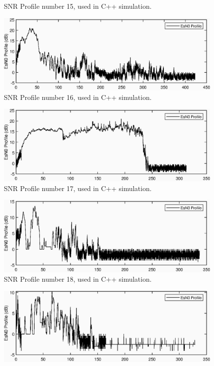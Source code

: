 \begin{appendices}
\begin{figure}[ht!]
\caption{SNR Profile number 15, used in C++ simulation.}
\end{figure}
\begin{figure}[ht!]
\includegraphics{figures/c_sim_snr/EsNo_profile_16.eps}
\caption{SNR Profile number 16, used in C++ simulation.}
\end{figure}
\begin{figure}[ht!]
\includegraphics{figures/c_sim_snr/EsNo_profile_17.eps}
\caption{SNR Profile number 17, used in C++ simulation.}
\end{figure}
\begin{figure}[ht!]
\includegraphics{figures/c_sim_snr/EsNo_profile_18.eps}
\caption{SNR Profile number 18, used in C++ simulation.}
\end{figure}
\begin{figure}[ht!]
\includegraphics{figures/c_sim_snr/EsNo_profile_19.eps}

\end{figure}
\end{appendices}
